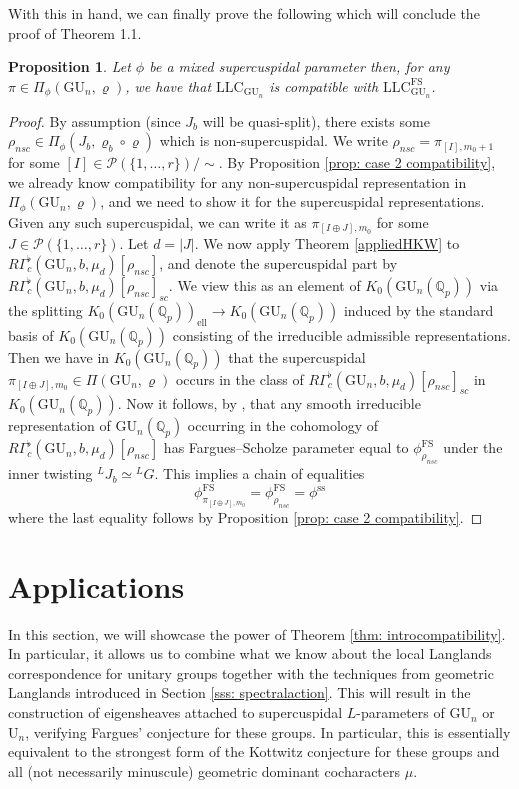 \documentclass[reqno,11pt]{amsart}
\newtheorem{proposition}[theorem]{Proposition}
\theoremstyle{remark}
\newcommand{\GU}{\mathrm{GU}}
\newcommand{\U}{\mathrm{U}}
\newcommand{\mc}{\mathcal}
\newcommand{\Q}{\mathbb{Q}}
\newcommand{\LLC}{\mathrm{LLC}}
\newcommand{\semis}{\mathrm{ss}}
\begin{document}
With this in hand, we can finally prove the following which will conclude the proof of Theorem 1.1.
\begin{proposition}
Let $\phi$ be a mixed supercuspidal parameter then, for any $\pi \in \Pi_{\phi}(\GU_n, \varrho)$, we have that $\LLC_{\GU_n}$ is compatible with $\LLC^{\mathrm{FS}}_{\GU_n}$. 
\end{proposition}
\begin{proof}
By assumption (since $J_b$ will be quasi-split), there exists some $\rho_{nsc} \in \Pi_{\phi}(J_{b}, \varrho_b \circ \varrho)$ which is non-supercuspidal. We write $\rho_{nsc} = \pi_{[I],m_0+1}$ for some $[I] \in \mc{P}(\{1, \dots, r\})/ \sim$. By Proposition \ref{prop: case 2 compatibility}, we already know compatibility for any non-supercuspidal representation in $\Pi_{\phi}(\GU_{n},\varrho)$, and we need to show it for the supercuspidal representations. Given any such supercuspidal, we can write it as $\pi_{[I \oplus J],m_0}$ for some $J \in \mc{P}(\{1,\ldots,r\})$. Let $d = |J|$. We now apply Theorem \ref{appliedHKW} to $R\Gamma^{\flat}_{c}(\GU_{n},b,\mu_{d})[\rho_{nsc}]$, and denote the supercuspidal part by $R\Gamma^{\flat}_{c}(\GU_{n},b,\mu_{d})[\rho_{nsc}]_{sc}$. We view this as an element of $K_0(\GU_n(\Q_p))$ via the splitting $K_0(\GU_n(\Q_p))_{\mathrm{ell}} \to K_0(\GU_n(\Q_p))$ induced by the standard basis of $K_0(\GU_n(\Q_p))$ consisting of the irreducible admissible representations. Then we have in $K_{0}(\GU_{n}(\mathbb{Q}_{p}))$ that the supercuspidal $\pi_{[I \oplus J],m_0} \in \Pi(\GU_n, \varrho)$ occurs in the class of $R\Gamma^{\flat}_{c}(\GU_{n},b,\mu_{d})[\rho_{nsc}]_{sc}$ in $K_{0}(\GU_{n}(\mathbb{Q}_{p}))$. Now it follows, by \cite[Corollary~3.15]{Ham}, that any smooth irreducible representation of $\GU_n(\mathbb{Q}_{p})$ occurring in the cohomology of $R\Gamma^{\flat}_{c}(\GU_n,b,\mu_{d})[\rho_{nsc}]$ has Fargues--Scholze parameter equal to $\phi_{\rho_{nsc}}^{\mathrm{FS}}$ under the inner twisting $\phantom{}^{L}J_{b} \simeq \phantom{}^{L}G$. This implies a chain of equalities 
\[ \phi^{\mathrm{FS}}_{\pi_{[I \oplus J],m_0}} =  \phi_{\rho_{nsc}}^{\mathrm{FS}} = \phi^{\semis} \]
where the last equality follows by Proposition \ref{prop: case 2 compatibility}.
\end{proof}
\section{Applications}{\label{s: applications}}
In this section, we will showcase the power of Theorem \ref{thm: introcompatibility}. In particular, it allows us to combine what we know about the local Langlands correspondence for unitary groups together with the techniques from geometric Langlands introduced in Section \ref{sss: spectralaction}. This will result in the construction of eigensheaves attached to supercuspidal $L$-parameters of $\GU_{n}$ or $\U_{n}$, verifying Fargues' conjecture \cite[Conjecture~4.3]{Fa} for these groups. In particular, this is essentially equivalent to the strongest form of the Kottwitz conjecture for these groups and all (not necessarily minuscule) geometric dominant cocharacters $\mu$. 
\end{document}
